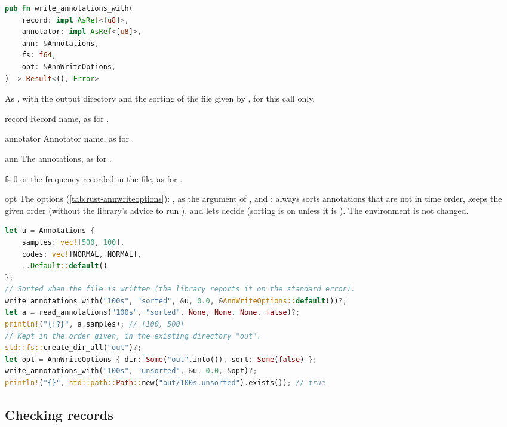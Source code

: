 \begin{lstlisting}[language=Rust,style=signature]
pub fn write_annotations_with(
    record: impl AsRef<[u8]>,
    annotator: impl AsRef<[u8]>,
    ann: &Annotations,
    fs: f64,
    opt: &AnnWriteOptions,
) -> Result<(), Error>
\end{lstlisting}
As , with the output directory and the sorting of the file given
by , for this call only.
\begin{params}
\item[record] Record name, as for .
\item[annotator] Annotator name, as for .
\item[ann] The annotations, as for .
\item[fs] 0 or the frequency recorded in the file, as for .
\item[opt] The options (\cref{tab:rust-annwriteoptions}): , as the argument
   of , and :  always sorts
  annotations that are not in time order,  keeps the given order
  (without the library's advice to run ), and  lets
   decide (sorting is on unless it is ). The environment is not
  changed.
\end{params}
\begin{lstlisting}[language=Rust,style=example]
let u = Annotations {
    samples: vec![500, 100],
    codes: vec![NORMAL, NORMAL],
    ..Default::default()
};
// Sorted when the file is written (the library reports it on the standard error).
write_annotations_with("100s", "sorted", &u, 0.0, &AnnWriteOptions::default())?;
let a = read_annotations("100s", "sorted", None, None, None, false)?;
println!("{:?}", a.samples); // [100, 500]
// Kept in the order given, in the existing directory "out".
std::fs::create_dir_all("out")?;
let opt = AnnWriteOptions { dir: Some("out".into()), sort: Some(false) };
write_annotations_with("100s", "unsorted", &u, 0.0, &opt)?;
println!("{}", std::path::Path::new("out/100s.unsorted").exists()); // true
\end{lstlisting}

\subsection{Checking records}
\label{sec:rust-checking}

